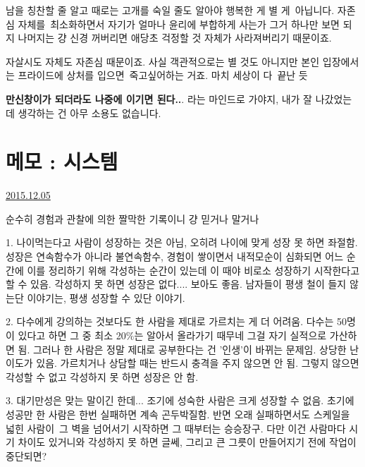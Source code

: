 남을 칭찬할 줄 알고 때로는 고개를 숙일 줄도 알아야 행복한 게 별 게 아닙니다.
자존심 자체를 최소화하면서 자기가 얼마나 윤리에 부합하게 사는가 그거 하나만 보면 되지
나머지는 걍 신경 꺼버리면 애당초 걱정할 것 자체가 사라져버리기 때문이죠.
\vspace{5mm}

자살시도 자체도 자존심 때문이죠.
사실 객관적으로는 별 것도 아니지만 본인 입장에서는 프라이드에 상처를 입으면 죽고싶어하는 거죠. 마치 세상이 다 끝난 듯
\vspace{5mm}

\textbf{만신창이가 되더라도 나중에 이기면 된다..}. 라는 마인드로 가야지, 내가 잘 나갔었는데 생각하는 건 아무 소용도 없습니다.
\vspace{5mm}






\section{메모 : 시스템}
\href{https://www.kockoc.com/Apoc/528655}{2015.12.05}

\vspace{5mm}

순수히 경험과 관찰에 의한 짤막한 기록이니 걍 믿거나 말거나
\vspace{5mm}

\item 1. 나이먹는다고 사람이 성장하는 것은 아님, 오히려 나이에 맞게 성장 못 하면 좌절함.
성장은 연속함수가 아니라 불연속함수, 경험이 쌓이면서 내적모순이 심화되면
어느 순간에 이를 정리하기 위해 각성하는 순간이 있는데 이 때야 비로소 성장하기 시작한다고 할 수 있음.
각성하지 못 하면 성장은 없다.... 보아도 좋음. 남자들이 평생 철이 들지 않는단 이야기는, 평생 성장할 수 있단 이야기.
\vspace{5mm}

\item 2. 다수에게 강의하는 것보다도 한 사람을 제대로 가르치는 게 더 어려움.
다수는 50명이 있다고 하면 그 중 최소 20$\%$는 알아서 올라가기 때무네 그걸 자기 실적으로 가산하면 됨.
그러나 한 사람은 정말 제대로 공부한다는 건 '인생'이 바뀌는 문제임. 상당한 난이도가 있음.
가르치거나 상담할 때는 반드시 충격을 주지 않으면 안 됨. 그렇지 않으면 각성할 수 없고 각성하지 못 하면 성장은 안 함.
\vspace{5mm}

\item 3. 대기만성은 맞는 말이긴 한데...
조기에 성숙한 사람은 크게 성장할 수 없음. 초기에 성공만 한 사람은 한번 실패하면 계속 곤두박질함.
반면 오래 실패하면서도 스케일을 넓힌 사람이 그 벽을 넘어서기 시작하면 그 때부터는 승승장구.
다만 이건 사람마다 시기 차이도 있거니와 각성하지 못 하면 글쎄, 그리고 큰 그릇이 만들어지기 전에 작업이 중단되면?
\vspace{5mm}

